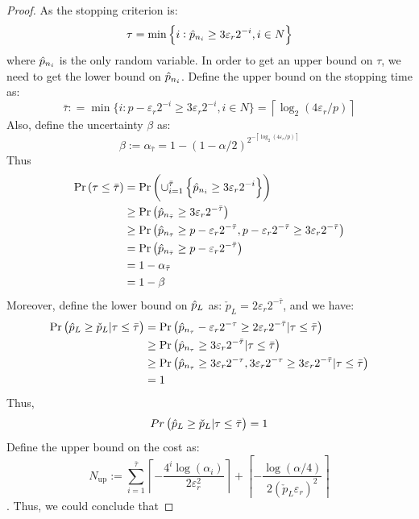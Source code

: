 \documentclass{iitthesis}
\theoremstyle{definition}
\begin{document}
\begin{proof}
As the stopping criterion is: $$\tau = \min\left\{i: \hat{p}_{n_i}\geq 3\varepsilon_r 2^{-i}, i \in N\right \}$$
where $\hat{p}_{n_i}$ is the only random variable. In order to get an upper bound on $\tau$, we need to get the lower bound on $\hat{p}_{n_i}$.
Define the upper bound on the stopping time as:
$$\bar{\tau}: = \min \{i:  p-\varepsilon_r2^{-i} \geq 3\varepsilon_r 2^{-i}, i \in N\} =\left \lceil \log_2 (4\varepsilon_r/p)\right \rceil$$
Also, define the uncertainty $\beta$ as:
$$\beta := \alpha_{\bar{\tau}}=1-(1-\alpha/2)^{2^{-\left \lceil \log_2 (4\varepsilon_r/p)\right \rceil}}$$
Thus 
\begin{align}
\Pr\left (\tau \leq \bar{\tau}\right) &= \Pr \left (\cup_{i=1}^{\bar{\tau}}\left \{\hat{p}_{n_i}\geq 3\varepsilon_r 2^{-i} \right \} \right) \\&
\geq \Pr\left( \hat{p}_{n_{\bar{\tau}}} \geq 3\varepsilon_r 2^{-\bar{\tau}}\right) \\&
\geq  \Pr \left( \hat{p}_{n_{\bar{\tau}}} \geq p-\varepsilon_r 2^{-\bar{\tau}} , p-\varepsilon_r 2^{-\bar{\tau}}  \geq 3 \varepsilon_r 2^{-\bar{\tau}}\right)\\&
= \Pr \left( \hat{p}_{n_{\bar{\tau}}} \geq p-\varepsilon_r 2^{-\bar{\tau}}\right) \\& =1-\alpha_{\bar{\tau}} \\& = 1-\beta
\end{align}
Moreover, define the lower bound on $\hat{p}_L$ as: $\check{p}_L = 2\varepsilon_r2^{-\bar{\tau}}$, and we have:
\begin{align}
\Pr\left(\hat{p}_L  \geq  \check{p}_L  | \tau \leq \bar{\tau}\right)& = \Pr\left(\hat{p}_{n_\tau} - \varepsilon_r 2^{-\tau}\geq 2\varepsilon_r2^{-\bar{\tau}}| \tau \leq \bar{\tau}\right)\\&\geq \Pr\left(\hat{p}_{n_{\tau}}\geq 3\varepsilon_r2^{-{\bar{\tau}}}| \tau \leq \bar{\tau}\right) \\& \geq 
\Pr\left(\hat{p}_{n_{\tau}}\geq 3\varepsilon_r2^{-{\tau}}, 3\varepsilon_r2^{-{\tau}} \geq 3\varepsilon_r2^{-{\bar{\tau}}} | \tau \leq \bar{\tau}\right)\\&
=1
\end{align}
Thus, $$Pr\left(\hat{p}_L \geq \check{p}_L | \tau \leq \bar{\tau}\right)=1$$
Define the upper bound on the cost as:  
$$N_{\text{up}}:= \sum_{i=1}^{\bar{\tau}} \left \lceil -\frac{4^i \log(\alpha_i)} {2\varepsilon_r^2 } \right\rceil+\left \lceil -\frac{\log (\alpha/4)}{2  (\check{p}_L \varepsilon_{r})^2} \right \rceil$$. Thus, we could conclude that

\end{proof}
\end{document}
